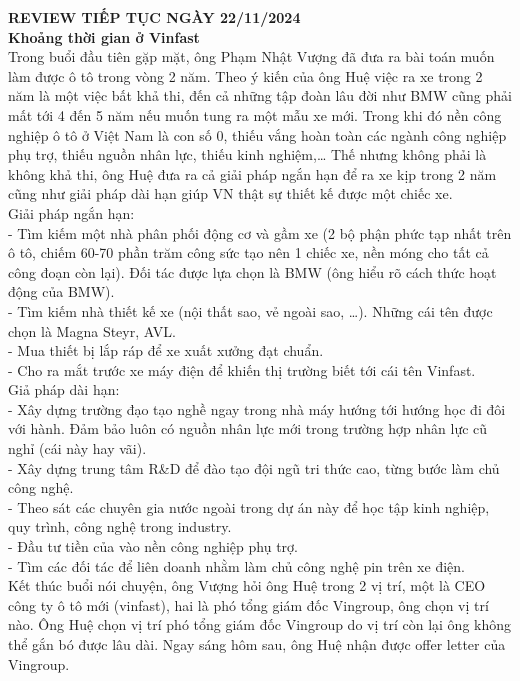 \documentclass{article}
\newcommand\tab[1][1cm]{\hspace*{#1}}
\begin{document}
\tab \textbf{REVIEW TIẾP TỤC NGÀY 22/11/2024}\\
\tab \textbf{Khoảng thời gian ở Vinfast}\\
\tab Trong buổi đầu tiên gặp mặt, ông Phạm Nhật Vượng đã đưa ra bài toán muốn làm được ô tô trong vòng 2 năm.
Theo ý kiến của ông Huệ việc ra xe trong 2 năm là một việc bất khả thi, đến cả những tập đoàn lâu đời như BMW
cũng phải mất tới 4 đến 5 năm nếu muốn tung ra một mẫu xe mới. Trong khi đó nền công nghiệp ô tô ở Việt Nam là 
con số 0, thiếu vắng hoàn toàn các ngành công nghiệp phụ trợ, thiếu nguồn nhân lực, thiếu kinh nghiệm,\dots 
Thế nhưng không phải là không khả thi, ông Huệ đưa ra cả giải pháp ngắn hạn để ra xe kịp trong 2 năm cũng như 
giải pháp dài hạn giúp VN thật sự thiết kế được một chiếc xe.\\
\tab Giải pháp ngắn hạn:\\
\tab - Tìm kiếm một nhà phân phối động cơ và gầm xe (2 bộ phận phức tạp nhất trên ô tô, chiếm 60-70 phần trăm
công sức tạo nên 1 chiếc xe, nền móng cho tất cả công đoạn còn lại). Đối tác được lựa chọn là BMW (ông hiểu rõ cách thức hoạt động của BMW).\\
\tab - Tìm kiếm nhà thiết kế xe (nội thất sao, vẻ ngoài sao, \dots). Những cái tên được chọn là Magna Steyr, AVL.\\
\tab - Mua thiết bị lắp ráp để xe xuất xưởng đạt chuẩn.\\
\tab - Cho ra mắt trước xe máy điện để khiến thị trường biết tới cái tên Vinfast.\\
\tab Giả pháp dài hạn:\\
\tab - Xây dựng trường đạo tạo nghề ngay trong nhà máy hướng tới hướng học đi đôi với hành. Đảm bảo luôn có 
nguồn nhân lực mới trong trường hợp nhân lực cũ nghỉ (cái này hay vãi).\\
\tab - Xây dựng trung tâm R\&D để đào tạo đội ngũ tri thức cao, từng bước làm chủ công nghệ.\\
\tab - Theo sát các chuyên gia nước ngoài trong dự án này để học tập kinh nghiệp, quy trình, công nghệ trong industry.\\
\tab - Đầu tư tiền của vào nền công nghiệp phụ trợ.\\
\tab - Tìm các đối tác để liên doanh nhằm làm chủ công nghệ pin trên xe điện.\\
\tab Kết thúc buổi nói chuyện, ông Vượng hỏi ông Huệ trong 2 vị trí, một là CEO công ty ô tô mới (vinfast), hai là 
phó tổng giám đốc Vingroup, ông chọn vị trí nào. Ông Huệ chọn vị trí phó tổng giám đốc Vingroup do vị trí còn lại 
ông không thể gắn bó được lâu dài. Ngay sáng hôm sau, ông Huệ nhận được offer letter của Vingroup.\\
\end{document}
